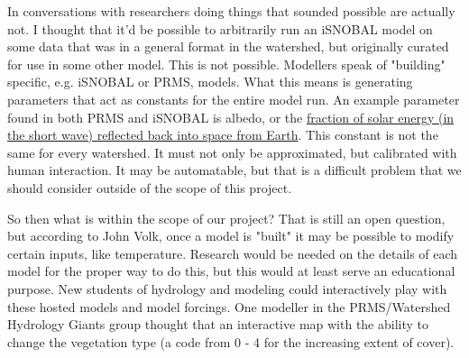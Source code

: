 \documentclass[
11pt, %
a4paper, %
oneside, %
twoside, %
headinclude,footinclude, %
BCOR5mm, %
]{scrartcl}
\begin{document}
In conversations with researchers doing things that sounded possible are actually not. 
I thought that it'd be possible to arbitrarily run an iSNOBAL model on some data that
was in a general format in the watershed, but originally curated for use in some other model.
This is not possible. Modellers speak of "building" specific, e.g. iSNOBAL or PRMS, models.
What this means is generating parameters that act as constants for the entire model run. 
An example parameter found in both PRMS and iSNOBAL is albedo, or the \href{https://www.esr.org/outreach/glossary/albedo.html}{fraction of solar energy (in the short wave) reflected back into space from Earth}. 
This constant is not the same for every watershed. It must not only be approximated,
but calibrated with human interaction. It may be automatable, but that is a difficult 
problem that we should consider outside of the scope of this project.

So then what is within the scope of our project? That is still an open question, but
according to John Volk, once a model is "built" it may be possible to modify certain 
inputs, like temperature. Research would be needed on the details of each model for
the proper way to do this, but this would at least serve an educational purpose. New students
of hydrology and modeling could interactively play with these hosted models and model 
forcings. One modeller in the PRMS/Watershed Hydrology Giants group thought that 
an interactive map with the ability to change the vegetation type (a code from 0 - 4 for the
increasing extent of cover). 




\end{document}
